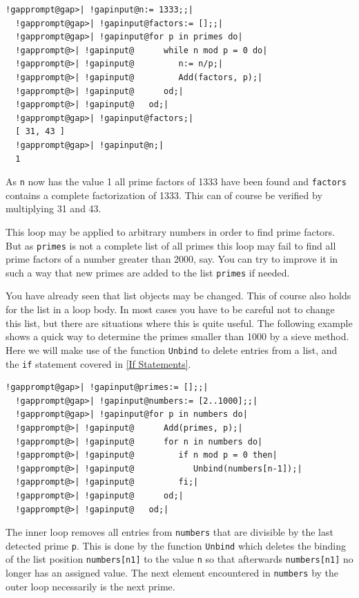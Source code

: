 \documentclass[a4paper,11pt]{report}
\begin{document}
{{ 
\begin{Verbatim}[commandchars=!@|,fontsize=\small,frame=single,label=Example]
  !gapprompt@gap>| !gapinput@n:= 1333;;|
  !gapprompt@gap>| !gapinput@factors:= [];;|
  !gapprompt@gap>| !gapinput@for p in primes do|
  !gapprompt@>| !gapinput@      while n mod p = 0 do|
  !gapprompt@>| !gapinput@         n:= n/p;|
  !gapprompt@>| !gapinput@         Add(factors, p);|
  !gapprompt@>| !gapinput@      od;|
  !gapprompt@>| !gapinput@   od;|
  !gapprompt@gap>| !gapinput@factors;|
  [ 31, 43 ]
  !gapprompt@gap>| !gapinput@n;|
  1
\end{Verbatim}
 

 As \texttt{n} now has the value 1 all prime factors of 1333 have been found and \texttt{factors} contains a complete factorization of 1333. This can of course be verified by
multiplying 31 and 43. 

 This loop may be applied to arbitrary numbers in order to find prime factors.
But as \texttt{primes} is not a complete list of all primes this loop may fail to find all prime
factors of a number greater than 2000, say. You can try to improve it in such
a way that new primes are added to the list \texttt{primes} if needed. 

 You have already seen that list objects may be changed. This of course also
holds for the list in a loop body. In most cases you have to be careful not to
change this list, but there are situations where this is quite useful. The
following example shows a quick way to determine the primes smaller than 1000
by a sieve method. Here we will make use of the function \texttt{Unbind} to delete entries from a list, and the \texttt{if} statement covered in \ref{If Statements}. 

 
\begin{Verbatim}[commandchars=!@|,fontsize=\small,frame=single,label=Example]
  !gapprompt@gap>| !gapinput@primes:= [];;|
  !gapprompt@gap>| !gapinput@numbers:= [2..1000];;|
  !gapprompt@gap>| !gapinput@for p in numbers do|
  !gapprompt@>| !gapinput@      Add(primes, p);|
  !gapprompt@>| !gapinput@      for n in numbers do|
  !gapprompt@>| !gapinput@         if n mod p = 0 then|
  !gapprompt@>| !gapinput@            Unbind(numbers[n-1]);|
  !gapprompt@>| !gapinput@         fi;|
  !gapprompt@>| !gapinput@      od;|
  !gapprompt@>| !gapinput@   od;|
\end{Verbatim}
 

 The inner loop removes all entries from \texttt{numbers} that are divisible by the last detected prime \texttt{p}. This is done by the function \texttt{Unbind} which deletes the binding of the list position \texttt{numbers[n\texttt{}1]} to the value \texttt{n} so that afterwards \texttt{numbers[n\texttt{}1]} no longer has an assigned value. The next element encountered in \texttt{numbers} by the outer loop necessarily is the next prime. 

}}
\end{document}
